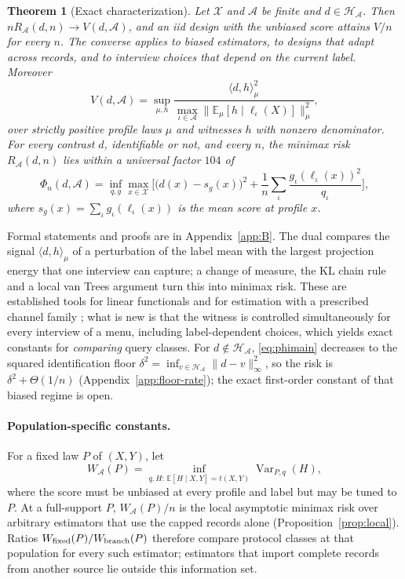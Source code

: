 \documentclass{article}
\newtheorem{theorem}{Theorem}
\newcommand{\E}{\mathbb{E}}
\newcommand{\Var}{\operatorname{Var}}
\newcommand{\X}{\mathcal X}
\newcommand{\A}{\mathcal A}
\newcommand{\Hh}{\mathcal H}
\begin{document}
\begin{theorem}[Exact characterization]\label{thm:char}
Let $\X$ and $\A$ be finite and $d\in\Hh_\A$. Then $nR_\A(d,n)\to V(d,\A)$, and an iid design with the unbiased score attains $V/n$ for every $n$. The converse applies to biased estimators, to designs that adapt across records, and to interview choices that depend on the current label. Moreover
\[
 V(d,\A)=\sup_{\mu,h}\frac{\langle d,h\rangle_\mu^2}{\max_{\iota\in\A}\|\E_\mu[h\mid\ell_\iota(X)]\|_\mu^2},
\]
over strictly positive profile laws $\mu$ and witnesses $h$ with nonzero denominator. For every contrast $d$, identifiable or not, and every $n$, the minimax risk $R_\A(d,n)$ lies within a universal factor $104$ of
\begin{equation}
 \Phi_n(d,\A)=\inf_{q,g}\max_{x\in\X}\Big[\big(d(x)-s_g(x)\big)^2+\frac1n\sum_\iota\frac{g_\iota(\ell_\iota(x))^2}{q_\iota}\Big],\!\!\label{eq:phimain}
\end{equation}
where $s_g(x)=\sum_\iota g_\iota(\ell_\iota(x))$ is the mean score at profile $x$.
\end{theorem}
Formal statements and proofs are in Appendix~\ref{app:B}. The dual compares the signal $\langle d,h\rangle_\mu$ of a perturbation of the label mean with the largest projection energy that one interview can capture; a change of measure, the KL chain rule and a local van Trees argument turn this into minimax risk. These are established tools for linear functionals \citep{donoho1994,juditsky2009,polyanskiy2026} and for estimation with a prescribed channel family \citep{acharya2019,barnes2020}; what is new is that the witness is controlled simultaneously for every interview of a menu, including label-dependent choices, which yields exact constants for \emph{comparing} query classes. For $d\notin\Hh_\A$, \eqref{eq:phimain} decreases to the squared identification floor $\delta^2=\inf_{v\in\Hh_\A}\|d-v\|_\infty^2$, so the risk is $\delta^2+\Theta(1/n)$ (Appendix~\ref{app:floor-rate}); the exact first-order constant of that biased regime is open.

\paragraph{Population-specific constants.}
For a fixed law $P$ of $(X,Y)$, let
\begin{equation}
 W_{\A}(P)=\inf_{q,H:\,\E[H\mid X,Y]=t(X,Y)}\Var_{P,q}(H),\label{eq:mainW}
\end{equation}
where the score must be unbiased at every profile and label but may be tuned to $P$. At a full-support $P$, $W_\A(P)/n$ is the local asymptotic minimax risk over arbitrary estimators that use the capped records alone (Proposition~\ref{prop:local}). Ratios $W_{\rm fixed}(P)/W_{\rm branch}(P)$ therefore compare protocol classes at that population for every such estimator; estimators that import complete records from another source lie outside this information set.
\end{document}
